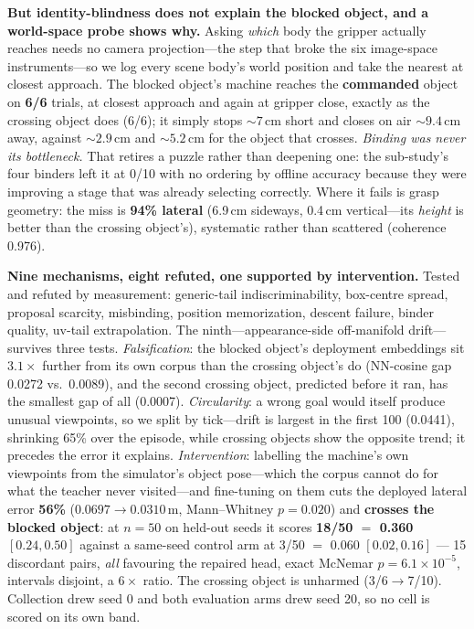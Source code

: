 \documentclass[10pt,letterpaper]{article}
\begin{document}
\noindent \textbf{But identity-blindness does not explain the blocked object,
and a world-space probe shows why.} Asking \emph{which} body the gripper
actually reaches needs no camera projection---the step that broke the six
image-space instruments---so we log every scene body's world position and take
the nearest at closest approach. The blocked object's machine reaches the
\textbf{commanded} object on \textbf{6/6} trials, at closest approach and again
at gripper close, exactly as the crossing object does (6/6); it simply stops
${\sim}7$\,cm short and closes on air ${\sim}9.4$\,cm away, against
${\sim}2.9$\,cm and ${\sim}5.2$\,cm for the object that crosses. \emph{Binding
was never its bottleneck.} That retires a puzzle rather than deepening one: the
sub-study's four binders left it at 0/10 with no ordering by offline accuracy
because they were improving a stage that was already selecting correctly.
Where it fails is grasp geometry: the miss is \textbf{94\% lateral} (6.9\,cm
sideways, 0.4\,cm vertical---its \emph{height} is better than the crossing
object's), systematic rather than scattered (coherence 0.976).

\noindent \textbf{Nine mechanisms, eight refuted, one supported by
intervention.} Tested and refuted by measurement: generic-tail
indiscriminability, box-centre spread, proposal scarcity, misbinding, position
memorization, descent failure, binder quality, uv-tail extrapolation. The
ninth---appearance-side off-manifold drift---survives three tests.
\emph{Falsification}: the blocked object's deployment embeddings sit
$3.1\times$ further from its own corpus than the crossing object's do
(NN-cosine gap 0.0272 vs.\ 0.0089), and the second crossing object, predicted
before it ran, has the smallest gap of all (0.0007). \emph{Circularity}: a
wrong goal would itself produce unusual viewpoints, so we split by tick---drift
is largest in the first 100 (0.0441), shrinking 65\% over the episode, while
crossing objects show the opposite trend; it precedes the error it explains.
\emph{Intervention}: labelling the machine's own viewpoints from the
simulator's object pose---which the corpus cannot do for what the teacher never
visited---and fine-tuning on them cuts the deployed lateral error \textbf{56\%}
($0.0697\to0.0310$\,m, Mann--Whitney $p{=}0.020$) and \textbf{crosses the
blocked object}: at $n{=}50$ on held-out seeds it scores \textbf{18/50 $=$
0.360} $[0.24,0.50]$ against a same-seed control arm at 3/50 $=$ 0.060
$[0.02,0.16]$ --- 15 discordant pairs, \emph{all} favouring the repaired head,
exact McNemar $p{=}6.1\times10^{-5}$, intervals disjoint, a $6\times$ ratio. The
crossing object is unharmed (3/6$\to$7/10). Collection drew seed 0 and both
evaluation arms drew seed 20, so no cell is scored on its own band.
\end{document}

